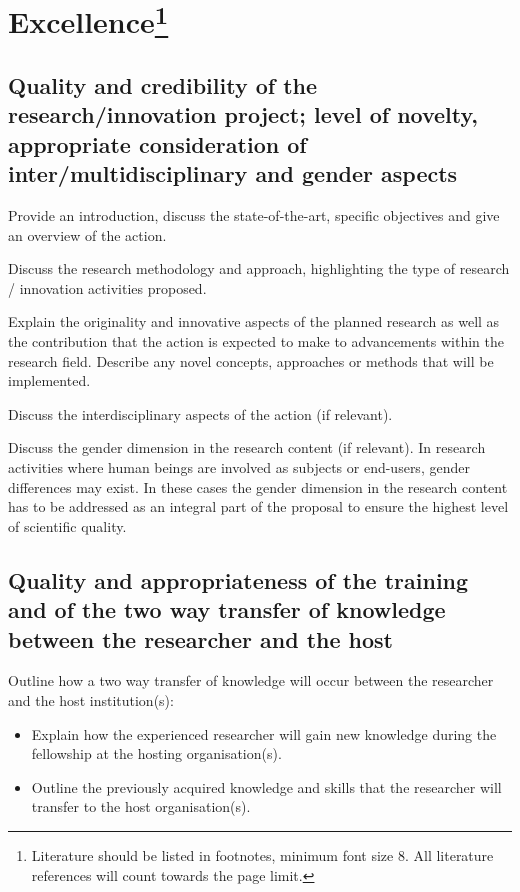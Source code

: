 
\markStartPageLimit
\section{Excellence\footnote{Literature should be listed in footnotes, minimum font size 8. All literature references will count towards the page limit.}}
\label{sec:excellence}


\subsection{Quality and credibility of the research/innovation project; level of novelty, appropriate consideration of inter/multidisciplinary and gender aspects}
\label{sec:excellence_quality}

Provide an introduction, discuss the state-of-the-art, specific objectives and give an
overview of the action.

\medskip\noindent
Discuss the research methodology and approach, highlighting the type of research /
innovation activities proposed.

\medskip\noindent
Explain the originality and innovative aspects of the planned research as well as the
contribution that the action is expected to make to advancements within the research
field. Describe any novel concepts, approaches or methods that will be implemented.

\medskip\noindent
Discuss the interdisciplinary aspects of the action (if relevant).

\medskip\noindent
Discuss the gender dimension in the research content (if relevant). In research activities
where human beings are involved as subjects or end-users, gender differences may
exist. In these cases the gender dimension in the research content has to be addressed
as an integral part of the proposal to ensure the highest level of scientific quality.


\subsection{Quality and appropriateness of the training and of the two way transfer of knowledge between the researcher and the host}
\label{sec:excellence_transfer}

Outline how a two way transfer of knowledge will occur between the researcher and the host institution(s):
\begin{itemize}
\item Explain how the experienced researcher will gain new knowledge during the fellowship at the hosting organisation(s).
\item Outline the previously acquired knowledge and skills that the researcher will transfer to the host organisation(s).
\end{itemize}


